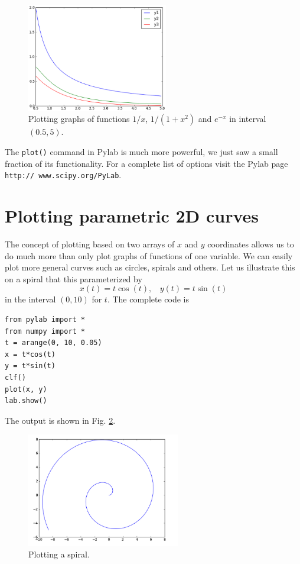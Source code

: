 \documentclass{article}
\begin{document}
\begin{figure}[!ht]
\begin{center}
\includegraphics[width=0.55\textwidth]{img/plot7.png}
\end{center}
\vspace{-4mm}
\caption{Plotting graphs of functions $1/x$, $1 / (1 + x^2)$ and $e^{-x}$ in interval $(0.5, 5)$.}
\label{fig:plot7}
\end{figure}
\noindent
The {\tt plot()} command in Pylab is much more powerful, we just saw a small 
fraction of its functionality. For a complete list of options 
visit the Pylab page {\tt http:// www.scipy.org/PyLab}.

\section{Plotting parametric 2D curves}\label{subsec:planarcurves}

The concept of plotting based on two arrays of $x$ and $y$ coordinates
allows us to do much more than only plot graphs of functions of one variable.
We can easily plot more general curves such as circles, spirals and others.
Let us illustrate this on a spiral that this parameterized 
by 
$$
x(t) = t \cos(t), \ \ \ \ 
y(t) = t \sin(t)
$$ 
in the interval $(0, 10)$ for $t$. The complete code is

\begin{verbatim}
from pylab import *
from numpy import *
t = arange(0, 10, 0.05)
x = t*cos(t)
y = t*sin(t)
clf()
plot(x, y)
lab.show()
\end{verbatim}
The output is shown in Fig. \ref{fig:plot6}.

\newpage

\begin{figure}[!ht]
\begin{center}
\includegraphics[width=0.6\textwidth]{img/plot6.png}
\end{center}
\vspace{-6mm}
\caption{Plotting a spiral.}
\label{fig:plot6}
\vspace{-0mm}
\end{figure}
\noindent
\end{document}
